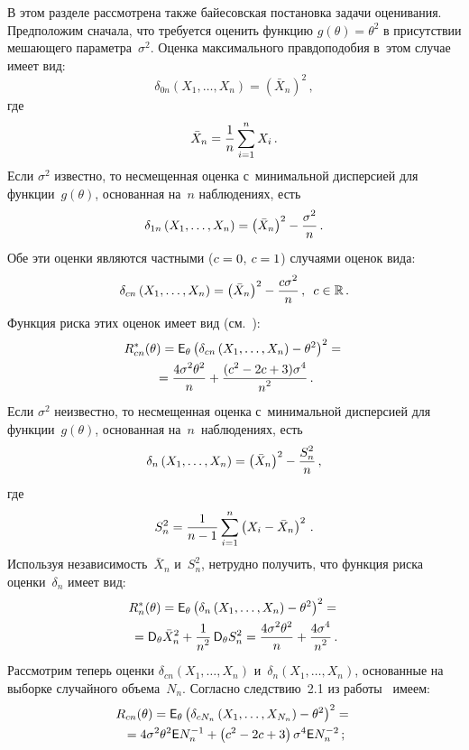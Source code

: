 \begin{multicols}{2}
В этом разделе рассмотрена также байесовская постановка задачи оценивания. 
Предположим сначала, что требуется оценить функцию
$
g(\theta) = \theta^2
$
в присутствии мешающего параметра~$\sigma^2$. Оценка максимального правдоподобия 
в~этом случае имеет вид:
$$
\delta_{0n}\left(X_1,\ldots,X_n\right) = \left(\bar X_n\right)^2\,,
$$
где
$$
\bar X_n = \displaystyle\frac{\displaystyle 1\mathstrut}{\displaystyle n\mathstrut} \sum\limits_{i=1}^n X_i\,.
$$
Если $\sigma^2$ известно, то несмещенная оценка с~минимальной дисперсией 
для функции~$g(\theta)$, основанная на~$n$ наблюдениях, есть
$$
\delta_{1n}\left(X_1,\ldots,X_n\right) = \left(\bar X_n\right)^2 -\displaystyle\frac{\displaystyle \sigma^2\mathstrut}{\displaystyle n\mathstrut}\,.
$$
Обе эти оценки являются частными ($c\hm = 0$, $c\hm = 1$) случаями оценок вида:
\begin{equation}
\delta_{cn}\left(X_1,\ldots,X_n\right) = 
\left(\bar X_n\right)^2 - \displaystyle\frac{\displaystyle c \sigma^2\mathstrut}{\displaystyle n\mathstrut}\,,\enskip
c \in \mathbb{R}\,.
\label{e2.1}
\end{equation}
Функция риска этих оценок имеет вид (см.~\cite[с.~302]{4-ben}):
\begin{multline}
R^*_{cn}(\theta) = {\sf E}_\theta \left(\delta_{cn}\left(X_1,\ldots,X_n\right) - 
\theta^2\right)^2 = {}\\
{}=\displaystyle\frac{\displaystyle 4 \sigma^2\theta^2\mathstrut}{\displaystyle n\mathstrut} + 
\displaystyle\frac{\displaystyle (c^2 - 2c + 3) \sigma^4\mathstrut}{\displaystyle n^2\mathstrut}\,.\label{e2.2}
\end{multline}
Если $\sigma^2$ неизвестно, то несмещенная оценка с~минимальной дисперсией 
для функции~$g(\theta)$, основанная на~$n$~наблюдениях, есть
\begin{equation*}
\delta_{n}\left(X_1,\ldots,X_n\right) = \left(\bar X_n\right)^2 - 
\fr{S^2_n}{n}\,, %
\end{equation*}
где
$$
S^2_n = \displaystyle\frac{\displaystyle 1\mathstrut}{\displaystyle n-1\mathstrut} \sum\limits_{i=1}^n \left(X_i - \bar X_n\right)^2\,.
$$
Используя независимость~$\bar X_n$ и~$S_n^2$, нетрудно получить, 
что функция риска оценки~$\delta_n$ имеет вид:
\begin{multline*}
R^*_{n}(\theta) = {\sf E}_\theta \left(\delta_{n}\left(X_1,\ldots,X_n\right) - 
\theta^2\right)^2 = {}\\
{}={\sf D}_\theta \bar X_n^2 + \fr{1}{n^2}\, 
{\sf D}_\theta S_n^2 =
\fr{4\sigma^2\theta^2}{n} + \fr{4\sigma^4}{n^2}\,. %
\end{multline*}
Рассмотрим теперь оценки $\delta_{cn}(X_1,\ldots,X_n)$ 
и~$\delta_{n}(X_1,\ldots,X_n)$, основанные на выборке случайного объема~$N_n$. 
Согласно следствию~2.1 из работы~\cite{2-ben} имеем:
\begin{multline*}
R_{cn}(\theta) = {\sf E}_\theta \left(\delta_{cN_n}\left(X_1,\ldots,X_{N_n}\right) 
- \theta^2\right)^2 ={}\\
{}= 4\sigma^2\theta^2 {\sf E} N_n^{-1} + 
\left(c^2 - 2c + 3\right) \sigma^4 {\sf E} N_n^{-2}\,;
\end{multline*}


\end{multicols}

